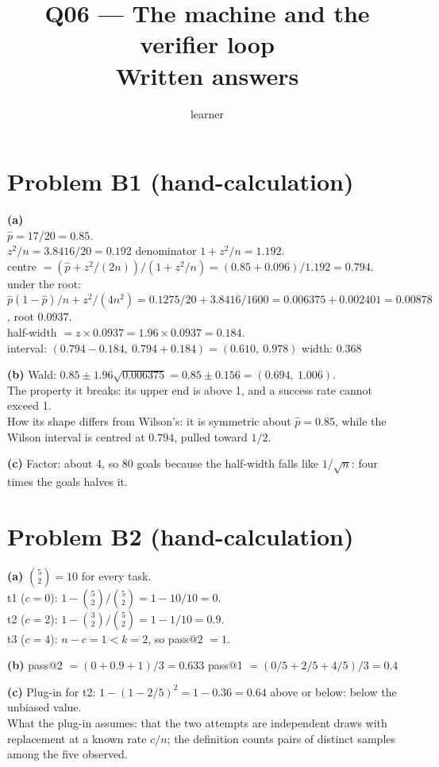 \documentclass[11pt]{article}
\title{Q06 --- The machine and the verifier loop \\ \large Written answers}
\author{learner}
\date{}
\begin{document}
\maketitle

\section*{Problem B1 (hand-calculation)}\label{ans:B1}
\begin{answer}
\textbf{(a)} \\
$\hat p = 17/20 = 0.85$. \\
$z^2/n = 3.8416/20 = 0.192$ \quad denominator $1 + z^2/n = 1.192$. \\
centre $= (\hat p + z^2/(2n))/(1 + z^2/n) = (0.85 + 0.096)/1.192 = 0.794$. \\
under the root: $\hat p(1 - \hat p)/n + z^2/(4n^2) = 0.1275/20 + 3.8416/1600 =
0.006375 + 0.002401 = 0.00878$, root $0.0937$. \\
half-width $= z \times 0.0937 = 1.96 \times 0.0937 = 0.184$. \\
interval: $(0.794 - 0.184,\ 0.794 + 0.184) = (0.610,\ 0.978)$ \quad width: $0.368$

\textbf{(b)} Wald: $0.85 \pm 1.96\sqrt{0.006375} = 0.85 \pm 0.156 = (0.694,\ 1.006)$. \\
The property it breaks: its upper end is above 1, and a success rate cannot
exceed 1. \\
How its shape differs from Wilson's: it is symmetric about $\hat p = 0.85$,
while the Wilson interval is centred at $0.794$, pulled toward $1/2$.

\textbf{(c)} Factor: about 4, so 80 goals \quad because the half-width falls
like $1/\sqrt{n}$: four times the goals halves it.
\end{answer}

\section*{Problem B2 (hand-calculation)}\label{ans:B2}
\begin{answer}
\textbf{(a)} $\binom{5}{2} = 10$ for every task. \\
t1 ($c = 0$): $1 - \binom{5}{2}/\binom{5}{2} = 1 - 10/10 = 0$. \\
t2 ($c = 2$): $1 - \binom{3}{2}/\binom{5}{2} = 1 - 1/10 = 0.9$. \\
t3 ($c = 4$): $n - c = 1 < k = 2$, so pass@2 $= 1$.

\textbf{(b)} pass@2 $= (0 + 0.9 + 1)/3 = 0.633$ \quad pass@1 $= (0/5 + 2/5 + 4/5)/3 = 0.4$

\textbf{(c)} Plug-in for t2: $1 - (1 - 2/5)^2 = 1 - 0.36 = 0.64$ \quad above
or below: below the unbiased value. \\
What the plug-in assumes: that the two attempts are independent draws with
replacement at a known rate $c/n$; the definition counts pairs of distinct
samples among the five observed.
\end{answer}
\end{document}
